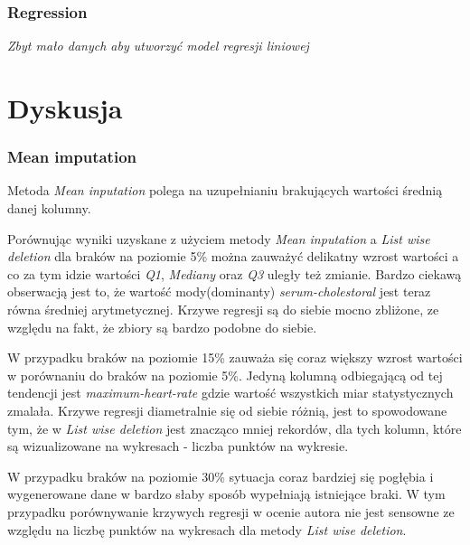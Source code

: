 \documentclass{classrep}
\begin{document}
{{{            }

            \subsubsection{Regression}
            \label{results:45-percent:regression} {
                \textit{Zbyt mało danych aby utworzyć model regresji liniowej}
            }
        }
    }

    \section{Dyskusja}
    \label{summary} {

        \subsubsection{Mean imputation}
        \label{summary:mean-input} {
            Metoda \textit{Mean inputation} polega na uzupełnianiu brakujących wartości średnią 
            danej kolumny.
        
            Porównując wyniki uzyskane z użyciem metody \textit{Mean inputation} a
            \textit{List wise deletion} dla braków na poziomie 5\% można zauważyć delikatny
            wzrost wartości a co za tym idzie wartości \textit{Q1}, \textit{Mediany} oraz \textit{Q3} uległy też zmianie. 
            Bardzo ciekawą obserwacją jest to, że wartość mody(dominanty)  \textit{serum-cholestoral} jest 
            teraz równa średniej arytmetycznej. Krzywe regresji są do siebie mocno zbliżone, ze względu na fakt, że zbiory są bardzo podobne do siebie.
            
            W przypadku braków na poziomie 15\% zauważa się coraz większy wzrost wartości 
            w porównaniu do braków na poziomie 5\%. Jedyną kolumną odbiegającą od tej 
            tendencji jest \textit{maximum-heart-rate} gdzie wartość wszystkich miar 
            statystycznych zmalała. Krzywe regresji diametralnie się od siebie różnią, 
            jest to spowodowane tym, że w \textit{List wise deletion} jest znacząco 
            mniej rekordów, dla tych kolumn, które są wizualizowane na wykresach - liczba punktów na wykresie.
            
            W przypadku braków na poziomie 30\% sytuacja coraz bardziej się pogłębia 
            i wygenerowane dane w bardzo słaby sposób wypełniają istniejące braki. W tym 
            przypadku porównywanie krzywych regresji w ocenie autora nie jest sensowne ze
            względu na liczbę punktów na wykresach dla metody \textit{List wise deletion}.
            
}}
\end{document}
